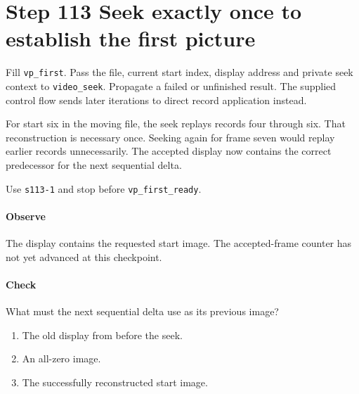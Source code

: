 \section{Step 113 Seek exactly once to establish the first picture}
Fill \texttt{vp\_first}. Pass the file, current start index, display address and private seek context to \texttt{video\_seek}. Propagate a failed or unfinished result. The supplied control flow sends later iterations to direct record application instead.

For start six in the moving file, the seek replays records four through six. That reconstruction is necessary once. Seeking again for frame seven would replay earlier records unnecessarily. The accepted display now contains the correct predecessor for the next sequential delta.

Use \texttt{s113-1} and stop before \texttt{vp\_first\_ready}.

\paragraph{Observe} The display contains the requested start image. The accepted-frame counter has not yet advanced at this checkpoint.

\paragraph{Check} What must the next sequential delta use as its previous image?
\begin{enumerate}[label=\Alph*.]
  \item The old display from before the seek.
  \item An all-zero image.
  \item The successfully reconstructed start image.
\end{enumerate}
